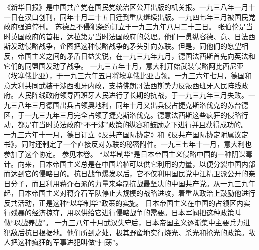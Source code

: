 \begin{maonote}
《新华日报》是中国共产党在国民党统治区公开出版的机关报。一九三八年一月十一日在汉口创刊，同年十月二十五日迁到重庆继续出版。一九四七年三月被国民党政府强迫停刊。
苏德互不侵犯条约订立于一九三九年八月二十三日。
张伯伦是当时英国政府的首相，达拉第是当时法国政府的总理。他们一贯纵容德、意、日法西斯发动侵略战争，企图把这种侵略战争的矛头引向苏联。但是，同他们的愿望相反，帝国主义之间的矛盾日益尖锐，在一九三九年九月，德国法西斯首先向英法和它们的同盟国发动了战争。
一九三五年十月，意大利开始武装侵略阿比西尼亚（埃塞俄比亚），于一九三六年五月将埃塞俄比亚占领。一九三六年七月，德国和意大利共同武装干涉西班牙内政，支持佛朗哥法西斯势力反叛西班牙人民阵线政府。人民阵线政府领导西班牙人民进行了长期的抗战，于一九三九年三月失败。一九三八年三月德国出兵占领奥地利，同年十月又出兵侵占捷克斯洛伐克的苏台德区，于一九三九年三月完全占领了捷克斯洛伐克。德意法西斯这些疯狂的侵略行动，都是在当时英法政府“不干涉”政策的纵容和鼓励之下进行并且获得成功的。
一九三六年十一月，德日订立《反共产国际协定》和《反共产国际协定附属议定书》，同时还制定了一个直接反对苏联的秘密附件。一九三七年十一月，意大利也参加了这个协定。
参见本卷。
“以华制华”是日本帝国主义侵略中国的一种阴谋毒计。向来，日本帝国主义总是在中国培植可以供它利用的力量，以便分裂中国内部而达到它的侵略目的。抗日战争爆发以后，它不仅利用国民党中汪精卫派公开的亲日分子，而且利用蒋介石派的力量来牵制抗战最坚决的中国共产党。从一九三九年起，日本帝国主义对蒋介石军队停止大规模的战略进攻，着重从政治上鼓励他进行反共活动，正是这种“以华制华”政策的实施。
日本帝国主义在中国的占领区内实行残暴的经济掠夺，用以供给它进行侵略战争的需要。日本军阀把这种政策叫做“以战养战”。
一九三八年十月武汉失守后，日本帝国主义逐渐集中主要兵力进犯敌后抗日根据地。他们所到之处，极其野蛮地实行烧光、杀光和抢光的政策。敌人把这种疯狂的军事进犯叫做“扫荡”。
\end{maonote}
